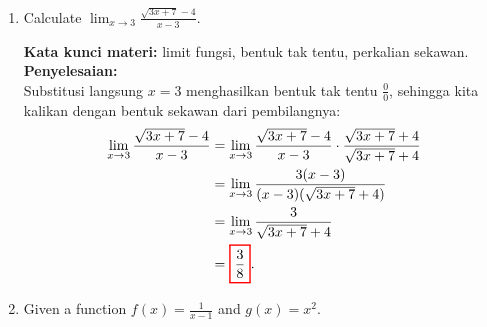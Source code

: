 \documentclass[10pt,openany,a4paper]{article}
\theoremstyle{definition}
\theoremstyle{definition}
\theoremstyle{plain}
\newenvironment{jawab}[2][tes]{%
\par\noindent\textbf{Kata kunci materi:} #1.\\
\textbf{Penyelesaian:} #2%
}{}
\begin{document}
\begin{enumerate}
            \begin{jawab}[turunan, aturan perkalian]{~\\
                Ingat kembali aturan turunan untuk perkalian fungsi, yaitu
                \[
                \colorlet{oldcolor}{.}
        \color{red}
        \setlength{\fboxrule}{1pt} \boxed{\color{oldcolor}\frac{d}{dx}\left(f(x)g(x)\right) = f'(x)g(x) + f(x)g'(x)}\color{oldcolor}.
                \]
                Karena $\colorlet{oldcolor}{.}
        \color{blue}
        \setlength{\fboxrule}{1pt} \boxed{\color{oldcolor}f'(x) = 6x - 7}\color{oldcolor}$ dan $\colorlet{oldcolor}{.}
        \color{blue}
        \setlength{\fboxrule}{1pt} \boxed{\color{oldcolor}g'(x) = -4x}\color{oldcolor}$, diperoleh
                \begin{align*}
                    \frac{d}{dx}\left(f(x)g(x)\right) &= (6x - 7)(3 - 2x^2) + (3x^2 - 7x)(-4x)\\
                    &= (18x - 12x^3 - 21 + 14x^2) + (-12x^3 + 28x^2)\\
                    &= \colorlet{oldcolor}{.}
        \color{red}
        \setlength{\fboxrule}{1pt} \boxed{\color{oldcolor}-24x^3 + 42x^2 + 18x - 21}\color{oldcolor}.
                \end{align*}
            }
            \end{jawab}
            \item Calculate $\displaystyle \lim_{x\to 3} \frac{\sqrt{3x+7}-4}{x-3}$.
            \begin{jawab}[limit fungsi, bentuk tak tentu, perkalian sekawan]{~\\
                Substitusi langsung $x=3$ menghasilkan bentuk tak tentu $\frac{0}{0}$, sehingga kita kalikan dengan bentuk sekawan dari pembilangnya:
                \begin{align*}
                    \lim_{x\to 3} \frac{\sqrt{3x+7}-4}{x-3} &= \lim_{x\to 3} \frac{\sqrt{3x+7}-4}{x-3}\cdot\frac{\sqrt{3x+7}+4}{\sqrt{3x+7}+4}\\
                    &= \lim_{x\to 3} \frac{3(x-3)}{(x-3)(\sqrt{3x+7}+4)}\\
                    &= \lim_{x\to 3} \frac{3}{\sqrt{3x+7}+4}\\
                    &= \colorlet{oldcolor}{.}
        \color{red}
        \setlength{\fboxrule}{1pt} \boxed{\color{oldcolor}\frac{3}{8}}\color{oldcolor}.
                \end{align*}
            }
            \end{jawab}
            \item Given a function $f(x)=\frac{1}{x-1}$ and $g(x)=x^2$.

\end{enumerate}
\end{document}
